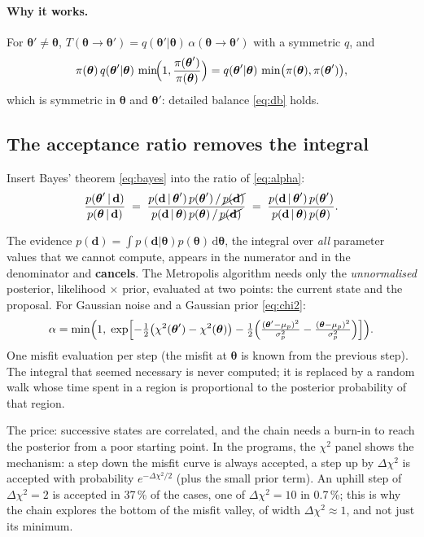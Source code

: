 \documentclass[11pt,a4paper]{article}
\newcommand{\dd}{\mathrm{d}}
\newcommand{\vth}{\boldsymbol{\theta}}
\newcommand{\vd}{\mathbf{d}}
\begin{document}
\paragraph{Why it works.} For $\vth'\neq\vth$, $T(\vth\to\vth')=q(\vth'|\vth)\,\alpha(\vth\to\vth')$ with a
symmetric $q$, and
\begin{equation}
  \pi(\vth)\,q(\vth'|\vth)\,\min\!\Bigl(1,\frac{\pi(\vth')}{\pi(\vth)}\Bigr)
  = q(\vth'|\vth)\,\min\bigl(\pi(\vth),\pi(\vth')\bigr),
\end{equation}
which is symmetric in $\vth$ and $\vth'$: detailed balance \eqref{eq:db} holds.

\subsection{The acceptance ratio removes the integral}\label{sec:cancel}
Insert Bayes' theorem \eqref{eq:bayes} into the ratio of \eqref{eq:alpha}:
\begin{equation}
  \frac{p(\vth'\,|\,\vd)}{p(\vth\,|\,\vd)}
  \;=\; \frac{p(\vd\,|\,\vth')\,p(\vth')\,/\,\cancel{p(\vd)}}{p(\vd\,|\,\vth)\,p(\vth)\,/\,\cancel{p(\vd)}}
  \;=\; \frac{p(\vd\,|\,\vth')\,p(\vth')}{p(\vd\,|\,\vth)\,p(\vth)} .
  \label{eq:cancel}
\end{equation}
\begin{keypoint}
The evidence $p(\vd)=\int p(\vd|\vth)p(\vth)\,\dd\vth$, the integral over \emph{all} parameter values that we
cannot compute, appears in the numerator and in the denominator and \textbf{cancels}. The Metropolis algorithm
needs only the \emph{unnormalised} posterior, likelihood $\times$ prior, evaluated at two points: the current
state and the proposal. For Gaussian noise and a Gaussian prior \eqref{eq:chi2}:
\begin{equation}
  \alpha = \min\Bigl(1,\;\exp\Bigl[-\tfrac12\bigl(\chi^2(\vth')-\chi^2(\vth)\bigr)
           -\tfrac12\Bigl(\tfrac{(\vth'-\mu_p)^2}{\sigma_p^2}-\tfrac{(\vth-\mu_p)^2}{\sigma_p^2}\Bigr)\Bigr]\Bigr).
\end{equation}
One misfit evaluation per step (the misfit at $\vth$ is known from the previous step). The integral that seemed
necessary is never computed; it is replaced by a random walk whose time spent in a region is proportional to the
posterior probability of that region.
\end{keypoint}
The price: successive states are correlated, and the chain needs a burn-in to reach the posterior from a poor
starting point. In the programs, the $\chi^2$ panel shows the mechanism: a step down the misfit curve is always
accepted, a step up by $\Delta\chi^2$ is accepted with probability $e^{-\Delta\chi^2/2}$ (plus the small prior
term). An uphill step of $\Delta\chi^2=2$ is accepted in 37\,\% of the cases, one of $\Delta\chi^2=10$ in
0.7\,\%; this is why the chain explores the bottom of the misfit valley, of width $\Delta\chi^2\approx1$, and
not just its minimum.
\end{document}
